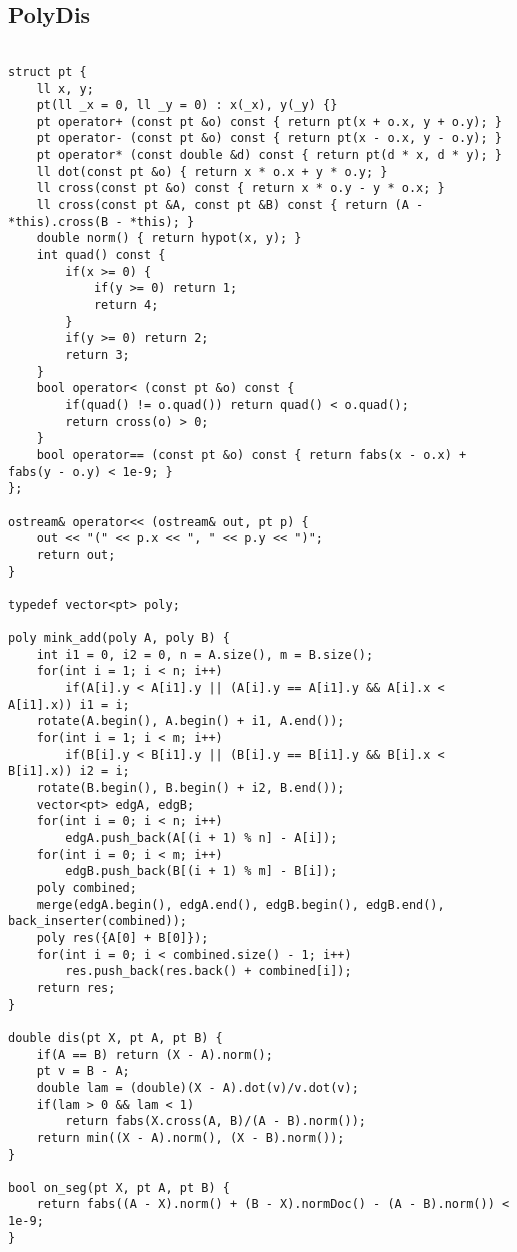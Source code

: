 \documentclass[twocolumn]{article}
\begin{document}
\subsection{PolyDis}
\lstset{basicstyle=\footnotesize\ttfamily,breaklines=true,tabsize=2,language=C++,frame=leftline, numbers=left, numberstyle=\tiny, numbersep=5pt}
\begin{lstlisting}

struct pt {
	ll x, y;
	pt(ll _x = 0, ll _y = 0) : x(_x), y(_y) {}
	pt operator+ (const pt &o) const { return pt(x + o.x, y + o.y); }
	pt operator- (const pt &o) const { return pt(x - o.x, y - o.y); }
	pt operator* (const double &d) const { return pt(d * x, d * y); }
	ll dot(const pt &o) { return x * o.x + y * o.y; }
	ll cross(const pt &o) const { return x * o.y - y * o.x; }
	ll cross(const pt &A, const pt &B) const { return (A - *this).cross(B - *this); }
	double norm() { return hypot(x, y); }
	int quad() const {
		if(x >= 0) {
			if(y >= 0) return 1;
			return 4;
		}
		if(y >= 0) return 2;
		return 3;
	}
	bool operator< (const pt &o) const {
		if(quad() != o.quad()) return quad() < o.quad();
		return cross(o) > 0;
	}
	bool operator== (const pt &o) const { return fabs(x - o.x) + fabs(y - o.y) < 1e-9; }
};

ostream& operator<< (ostream& out, pt p) {
	out << "(" << p.x << ", " << p.y << ")";
	return out;
}

typedef vector<pt> poly;

poly mink_add(poly A, poly B) {
	int i1 = 0, i2 = 0, n = A.size(), m = B.size();
	for(int i = 1; i < n; i++)
		if(A[i].y < A[i1].y || (A[i].y == A[i1].y && A[i].x < A[i1].x)) i1 = i;
	rotate(A.begin(), A.begin() + i1, A.end());
	for(int i = 1; i < m; i++)
		if(B[i].y < B[i1].y || (B[i].y == B[i1].y && B[i].x < B[i1].x)) i2 = i;
	rotate(B.begin(), B.begin() + i2, B.end());
	vector<pt> edgA, edgB;
	for(int i = 0; i < n; i++)
		edgA.push_back(A[(i + 1) % n] - A[i]);
	for(int i = 0; i < m; i++)
		edgB.push_back(B[(i + 1) % m] - B[i]);
	poly combined;
	merge(edgA.begin(), edgA.end(), edgB.begin(), edgB.end(), back_inserter(combined));
	poly res({A[0] + B[0]});
	for(int i = 0; i < combined.size() - 1; i++)
		res.push_back(res.back() + combined[i]);
	return res;
}

double dis(pt X, pt A, pt B) {
	if(A == B) return (X - A).norm();
	pt v = B - A;
	double lam = (double)(X - A).dot(v)/v.dot(v);
	if(lam > 0 && lam < 1)
		return fabs(X.cross(A, B)/(A - B).norm());
	return min((X - A).norm(), (X - B).norm());
}

bool on_seg(pt X, pt A, pt B) {
	return fabs((A - X).norm() + (B - X).normDoc() - (A - B).norm()) < 1e-9;
}


\end{lstlisting}
\end{document}
